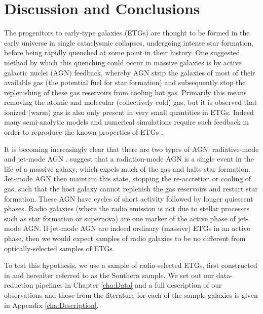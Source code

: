 \chapter{Discussion and Conclusions}
	\label{cha:conclusion}
The progenitors to early-type galaxies (ETGs) are thought to be formed in the early universe in single cataclysmic collapses, undergoing intense star formation, before being rapidly quenched at some point in their history. One suggested method by which this quenching could occur in massive galaxies is by active galactic nuclei (AGN) feedback, whereby AGN strip the galaxies of most of their available gas (the potential fuel for star formation) and subsequently stop the replenishing of these gas reservoirs from cooling hot gas. Primarily this means removing the atomic and molecular (collectively cold) gas, but it is observed that ionized (warm) gas is also only present in very small quantities in ETGs. Indeed many semi-analytic models and numerical simulations require such feedback in order to reproduce the known properties of ETGs \citep[e.g.][]{Kauffmann2000, DiMatteo2005, Springel2005, Bower2006}. 

It is becoming increasingly clear that there are two types of AGN: radiative-mode and jet-mode AGN \citep[e.g.][]{Antonucci2012}. \citet{Heckman2014} suggest that a radiation-mode AGN is a single event in the life of a massive galaxy, which expels much of the gas and halts star formation. Jet-mode AGN then maintain this state, stopping the re-accretion or cooling of gas, such that the host galaxy cannot replenish the gas reservoirs and restart star formation. These AGN have cycles of short activity followed by longer quiescent phases. Radio galaxies (where the radio emission is not due to stellar processes such as star formation or supernova) are one marker of the active phase of jet-mode AGN. If jet-mode AGN are indeed ordinary (massive) ETGs in an active phase, then we would expect samples of radio galaxies to be no different from optically-selected samples of ETGs. 

To test this hypothesis, we use a sample of radio-selected ETGs, first constructed in \citet{Prandoni2010} and hereafter referred to as the Southern sample. We set out our data-reduction pipelines in Chapter \ref{cha:Data} and a full description of our observations and those from the literature for each of the sample galaxies is given in Appendix \ref{cha:Description}. 


